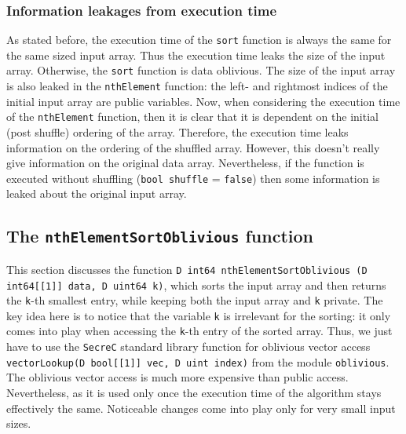 \documentclass[11pt]{article}
\newcommand{\ct}[1]{\texttt{#1}}
\newcommand{\SC}{\ct{SecreC}\xspace}
\begin{document}
\subsubsection{Information leakages from execution time} %
\label{ssub:information_leakages_from_execution_time}

As stated before, the execution time of the \ct{sort} function is always the same for the same sized input array. Thus the execution time leaks the size of the input array. Otherwise, the \ct{sort} function is data oblivious. The size of the input array is also leaked in the \ct{nthElement} function: the left- and rightmost indices of the initial input array are public variables. Now, when considering the execution time of the \ct{nthElement} function, then it is clear that it is dependent on the initial (post shuffle) ordering of the array. Therefore, the execution time leaks information on the ordering of the shuffled array. However, this doesn't really give information on the original data array. Nevertheless, if the function is executed without shuffling (\ct{bool shuffle} = \ct{false}) then some information is leaked about the original input array.




\subsection{The \ct{nthElementSortOblivious} function} %
\label{sub:the_nthelementsortoblivious_function}

This section discusses the function \ct{D int64 nthElementSortOblivious (D int64[[1]] data, D uint64 k)}, which sorts the input array and then returns the \ct{k}-th smallest entry, while keeping both the input array and \ct{k} private. The key idea here is to notice that the variable \ct{k} is irrelevant for the sorting: it only comes into play when accessing the \ct{k}-th entry of the sorted array. Thus, we just have to use the \SC standard library function for oblivious vector access \ct{vectorLookup(D bool[[1]] vec, D uint index)} from the module \ct{oblivious}. The oblivious vector access is much more expensive than public access. Nevertheless, as it is used only once the execution time of the algorithm stays effectively the same. Noticeable changes come into play only for very small input sizes.
\end{document}

